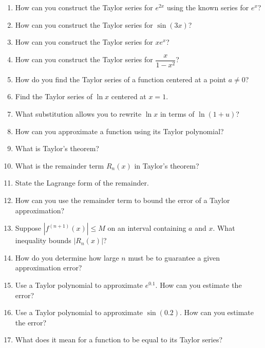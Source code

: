 \begin{enumerate}
\item How can you construct the Taylor series for $e^{2x}$ using the known series for $e^x$?

\item How can you construct the Taylor series for $\sin(3x)$?

\item How can you construct the Taylor series for $x e^x$?

\item How can you construct the Taylor series for $\dfrac{x}{1-x^2}$?

\item How do you find the Taylor series of a function centered at a point $a \neq 0$?

\item Find the Taylor series of $\ln x$ centered at $x=1$.

\item What substitution allows you to rewrite $\ln x$ in terms of $\ln(1+u)$?

\item How can you approximate a function using its Taylor polynomial?

\item What is Taylor's theorem?

\item What is the remainder term $R_n(x)$ in Taylor's theorem?

\item State the Lagrange form of the remainder.

\item How can you use the remainder term to bound the error of a Taylor approximation?

\item Suppose $|f^{(n+1)}(x)| \le M$ on an interval containing $a$ and $x$. What inequality bounds $|R_n(x)|$?

\item How do you determine how large $n$ must be to guarantee a given approximation error?

\item Use a Taylor polynomial to approximate $e^{0.1}$. How can you estimate the error?

\item Use a Taylor polynomial to approximate $\sin(0.2)$. How can you estimate the error?

\item What does it mean for a function to be equal to its Taylor series?


\end{enumerate}
